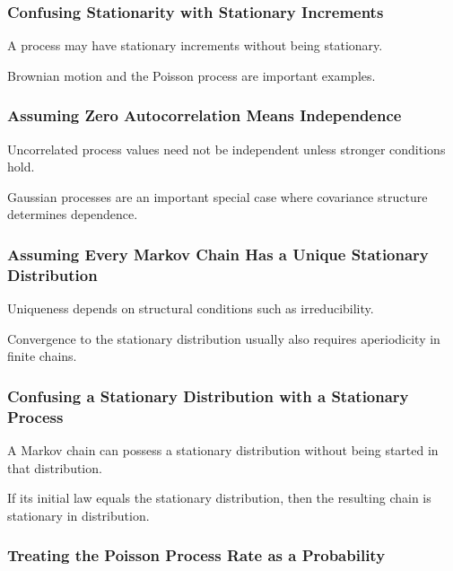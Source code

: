 \subsubsection{Confusing Stationarity with Stationary Increments}

A process may have stationary increments without being stationary.

Brownian motion and the Poisson process are important examples.

\subsubsection{Assuming Zero Autocorrelation Means Independence}

Uncorrelated process values need not be independent unless stronger
conditions hold.

Gaussian processes are an important special case where covariance
structure determines dependence.

\subsubsection{Assuming Every Markov Chain Has a Unique Stationary Distribution}

Uniqueness depends on structural conditions such as irreducibility.

Convergence to the stationary distribution usually also requires
aperiodicity in finite chains.

\subsubsection{Confusing a Stationary Distribution with a Stationary Process}

A Markov chain can possess a stationary distribution without being
started in that distribution.

If its initial law equals the stationary distribution, then the
resulting chain is stationary in distribution.

\subsubsection{Treating the Poisson Process Rate as a Probability}

